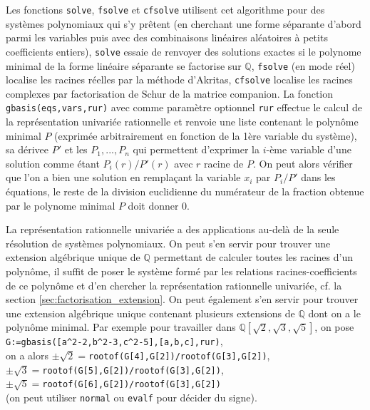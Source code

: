 \documentclass[a4paper,11pt]{article}
\newcommand{\Q}{{\mathbb{Q}}}
\begin{document}
Les fonctions \verb|solve|, \verb|fsolve| et \verb|cfsolve| 
utilisent cet algorithme
pour des systèmes polynomiaux qui s'y prêtent (en cherchant une
forme séparante d'abord parmi les variables puis avec des combinaisons
linéaires aléatoires à petits coefficients entiers),
\verb|solve| essaie de renvoyer des solutions exactes
si le polynome minimal de la forme lin\'eaire s\'eparante
se factorise sur $\Q$, \verb|fsolve| (en mode r\'eel)
localise les racines r\'eelles par la m\'ethode d'Akritas,
\verb|cfsolve| localise les racines complexes par
factorisation de Schur de la matrice companion. La fonction
\verb|gbasis(eqs,vars,rur)| avec comme paramètre optionnel \verb|rur|
effectue le calcul de la repr\'esentation univari\'ee rationnelle
et renvoie une liste contenant le polynôme minimal $P$
(exprimée arbitrairement en fonction de la 1ère variable du système),
sa dérivee $P'$ et les $P_1,...,P_n$ qui permettent d'exprimer
la $i$-ème variable d'une solution comme étant $P_i(r)/P'(r)$
avec $r$ racine de $P$. On peut alors
vérifier que l'on a bien une solution en remplaçant la variable
$x_i$ par $P_i/P'$ dans les équations, le reste de la division
euclidienne du numérateur de la fraction obtenue par le polynome 
minimal $P$ doit donner 0.

La repr\'esentation rationnelle univari\'ee a des applications
au-del\`a de la seule r\'esolution de syst\`emes polynomiaux.
On peut s'en servir pour trouver une extension alg\'ebrique unique de
$\Q$ permettant de calculer toutes les racines d'un polyn\^ome, 
il suffit de poser le syst\`eme form\'e par les relations
racines-coefficients de ce polyn\^ome et d'en chercher la
repr\'esentation rationnelle univari\'ee, cf. la section 
\ref{sec:factorisation_extension}.
On peut \'egalement s'en servir pour trouver une extension
alg\'ebrique 
unique contenant plusieurs extensions de $\Q$
dont on a le polyn\^ome minimal. Par exemple pour
travailler dans $\Q[\sqrt{2},\sqrt{3},\sqrt{5}]$, on pose \\
\verb|G:=gbasis([a^2-2,b^2-3,c^2-5],[a,b,c],rur)|,\\
on a alors $\pm \sqrt{2}=$\verb|rootof(G[4],G[2])/rootof(G[3],G[2])|,\\
$\pm \sqrt{3}=$\verb|rootof(G[5],G[2])/rootof(G[3],G[2])|,\\
$\pm \sqrt{5}=$\verb|rootof(G[6],G[2])/rootof(G[3],G[2])|\\
(on peut utiliser \verb|normal| ou \verb|evalf| pour d\'ecider du signe).
\end{document}
